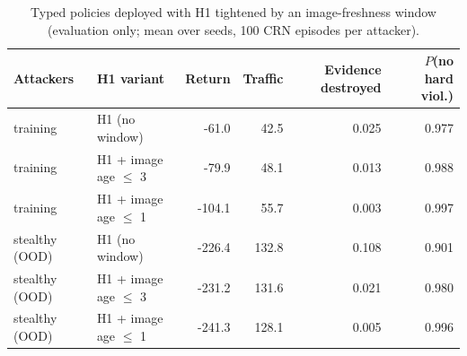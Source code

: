 \begin{table}[t]\centering
\caption{Typed policies deployed with H1 tightened by an image-freshness window (evaluation only; mean over seeds, 100 CRN episodes per attacker).}
\label{tab:freshness}\small
\begin{tabular}{llrrrr}\toprule
Attackers & H1 variant & Return & Traffic & Evidence destroyed & $P$(no hard viol.)\\\midrule
training & H1 (no window) & -61.0 & 42.5 & 0.025 & 0.977\\
training & H1 + image age $\le$ 3 & -79.9 & 48.1 & 0.013 & 0.988\\
training & H1 + image age $\le$ 1 & -104.1 & 55.7 & 0.003 & 0.997\\
stealthy (OOD) & H1 (no window) & -226.4 & 132.8 & 0.108 & 0.901\\
stealthy (OOD) & H1 + image age $\le$ 3 & -231.2 & 131.6 & 0.021 & 0.980\\
stealthy (OOD) & H1 + image age $\le$ 1 & -241.3 & 128.1 & 0.005 & 0.996\\
\bottomrule\end{tabular}\end{table}
